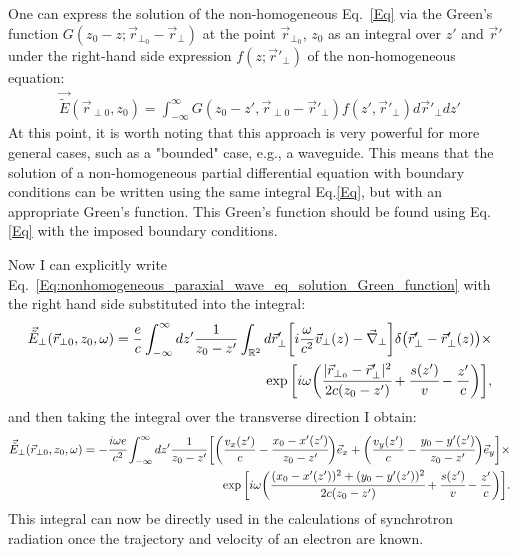     One can express the solution of the non-homogeneous Eq.~\ref{Eq} via the Green's function $G(z_0 - z; \vec{r}_{\perp_0} - \vec{r}_{\perp})$ at the point $\vec{r}_{\perp_0}$, $z_0$ as an integral over $z'$ and $\vec{r}'$ under the right-hand side expression $f(z; \vec{r}'_{\perp})$ of the non-homogeneous equation:
    \begin{align}
        \vec{\tilde{E}}(\vec{r}_{\perp 0}, z_0) = \int_{-\infty}^{\infty} G(z_0 - z', \vec{r}_{\perp 0} - \vec{r}'_{\perp}) f(z', \vec{r}'_{\perp})d\vec{r}'_{\perp}dz'
        \label{Eq:nonhomogeneous_paraxial_wave_eq_solution_Green_function}
    \end{align}
    At this point, it is worth noting that this approach is very powerful for more general cases, such as a "bounded" case, e.g., a waveguide. This means that the solution of a non-homogeneous partial differential equation with boundary conditions can be written using the same integral Eq.\ref{Eq}, but with an appropriate Green's function. This Green's function should be found using Eq.\ref{Eq} with the imposed boundary conditions.
    
    Now I can explicitly write Eq.~\ref{Eq:nonhomogeneous_paraxial_wave_eq_solution_Green_function} with the right hand side substituted into the integral:
    \begin{align}
        \vec{\tilde{E}}_{\perp}(\vec{r}_{\perp 0}, z_0, \omega) = 
        \frac{e}{c} \int_{-\infty}^{\infty} dz' \frac{1}{z_0 - z'} 
        \int_{\mathbb{R}^2} d\vec{r}'_{\perp} \bigg[i \frac{\omega}{c^2} \vec{v}_{\perp}(z) - \vec{\nabla}_{\perp}\bigg]
        \delta\big(\vec{r}'_{\perp} - \vec{r}'_{\perp}(z)\big) \times
        \cr \exp{\bigg[i\omega \bigg(\cfrac{|\vec{r}_{\perp_0} - \vec{r}'_{\perp}|^2}{2c(z_0 - z')} +  \cfrac{s(z')}{v} - \frac{z'}{c} \bigg)\bigg]},
    \end{align}
    and then taking the integral over the transverse direction I obtain:
    \begin{align}
        \vec{\tilde{E}}_{\perp}(\vec{r}_{\perp 0}, z_0, \omega) = - \cfrac{i \omega e}{c^2}\int_{-\infty}^{\infty} dz' \frac{1}{z_0 - z'}
        \bigg[\bigg(\frac{v_x(z')}{c} - \cfrac{x_0 - x'(z')}{z_0 - z'}\bigg)\vec{e}_x + \bigg(\frac{v_y(z')}{c} - \cfrac{y_0 - y'(z')}{z_0 - z'}\bigg)\vec{e}_y\bigg] \times
        \cr \exp{\bigg[i\omega \bigg(\cfrac{(x_0 - x'(z'))^2 + (y_0 - y'(z'))^2}{2c(z_0 - z')} +  \cfrac{s(z')}{v} - \frac{z'}{c} \bigg)\bigg]}.
        \label{Eq:funal_Eq_for_SR}
    \end{align}
    This integral can now be directly used in the calculations of synchrotron radiation once the trajectory and velocity of an electron are known.

